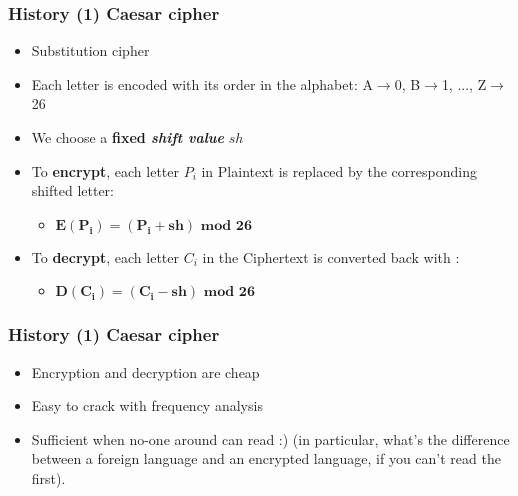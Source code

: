 \documentclass[
hyperref={pdfpagelabels=false}
,xcolor=table
]
{beamer}
\newcommand{\plus}{{\texttt{[image: plus.png]}}}
\newcommand{\minus}{{\texttt{[image: minus.png]}}}
\begin{document}

  


\begin{frame}
  \frametitle{History (1) Caesar cipher}

  \begin{itemize}
  \item Substitution cipher
  \item Each letter is encoded with its order in the alphabet: A$\rightarrow$0, B$\rightarrow$1, ..., Z$\rightarrow$26
  \item We choose a \textbf{fixed \textit{shift value}} $sh$
  \item To \textbf{encrypt}, each letter $P_i$ in Plaintext is replaced by the corresponding shifted letter:
    \begin{itemize}
    \item[] $\bm{E(P_i) = (P_i + sh) \mbox{ mod } 26}$
    \end{itemize}
  \item To \textbf{decrypt}, each letter $C_i$ in the Ciphertext is converted back with :
    \begin{itemize}
    \item[] $\bm{D(C_i) = (C_i - sh) \mbox{ mod } 26}$ 
    \end{itemize}
  \end{itemize}

  
\end{frame}



\begin{frame}
  \frametitle{History (1) Caesar cipher}
 
  \begin{itemize}
  \item[\plus] Encryption and decryption are cheap
  \item[\minus] Easy to crack with frequency analysis
  \item[\minus] Sufficient when no-one around can read :) (in
    particular, what's the difference between a foreign language and
    an encrypted language, if you can't read the first).
  \end{itemize}
\end{frame}
\end{document}
